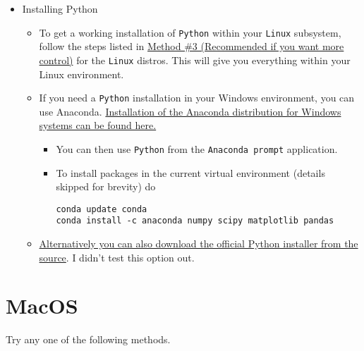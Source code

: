 \documentclass[11pt]{article}
\begin{document}
\begin{itemize}
\item Installing Python
\label{sec:org688ea31}

\begin{itemize}
\item To get a working installation of \texttt{Python} within your \texttt{Linux} subsystem, follow
the steps listed in \hyperref[sec:org0552b3e]{Method \#3 (Recommended if you want more control)} for the
\texttt{Linux} distros. This will give you everything within your Linux environment.
\item If you need a \texttt{Python} installation in your Windows environment, you can use
Anaconda. \href{https://www.anaconda.com/download/\#windows}{Installation of the Anaconda distribution for Windows systems can be found here.}
\begin{itemize}
\item You can then use \texttt{Python} from the \texttt{Anaconda prompt} application.
\item To install packages in the current virtual environment (details skipped for
brevity) do
\begin{verbatim}
conda update conda
conda install -c anaconda numpy scipy matplotlib pandas
\end{verbatim}
\end{itemize}
\item \href{https://www.python.org/downloads/windows/}{Alternatively you can also download the official Python installer from the source}. I
didn't test this option out.
\end{itemize}
\end{itemize}

\section*{MacOS}
\label{sec:orgfa7e3be}
Try any one of the following methods.
\end{document}
